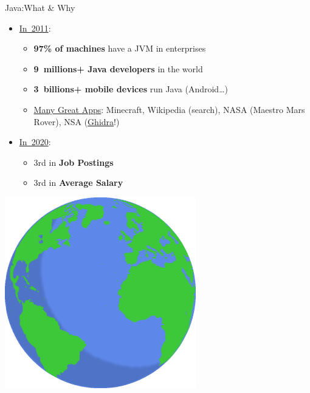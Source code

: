 \documentclass[English,c,%
hyperref={%
    pdftitle={FISA-DE2 OOP in Java},%
    pdfauthor={Muller, Gravier, Laforest, Subercaze},%
    pdfsubject={OOP in Java},%
    pdfkeywords={OOP, Java},%
    colorlinks=true,%
    urlcolor=blue,%
    linkcolor=%
    },%
xcolor={pdftex,svgnames} %
]{beamer}
\begin{document}
\begin{frame}{Java:What \& Why}
  \hspace{3cm}
  \begin{itemize}
    \item \href{https://www.jmdoudoux.fr/java/dej/chap-presentation.htm}{In~2011}:
    \begin{itemize}
      \item \textbf{97\% of machines} have a JVM in enterprises
      \medskip
      \item \textbf{9~millions+ Java developers} in the world
      \medskip
      \item \textbf{3~billions+ mobile devices} run Java (Android\ldots{})
      \medskip
      \item \href{https://blogs.oracle.com/javamagazine/the-top-25-greatest-java-apps-ever-written}{Many Great Apps}: Minecraft, Wikipedia (search), NASA (Maestro Mars Rover), NSA (\href{https://www.wired.com/story/nsa-ghidra-open-source-tool/}{Ghidra}!) %
    \end{itemize}
  \end{itemize}
  \medskip
  \begin{itemize}
    \item \href{https://www.codeplatoon.org/best-paying-most-in-demand-programming-languages-2020/}{In~2020}:
    \begin{itemize}
      \item 3rd in \textbf{Job Postings}
      \item 3rd in \textbf{Average Salary}
    \end{itemize}
  \end{itemize}

\bigskip
  \begin{center}
    \includegraphics[height=8.3cm]{images01/earth1.png}
  \end{center}

\end{frame}
\end{document}
